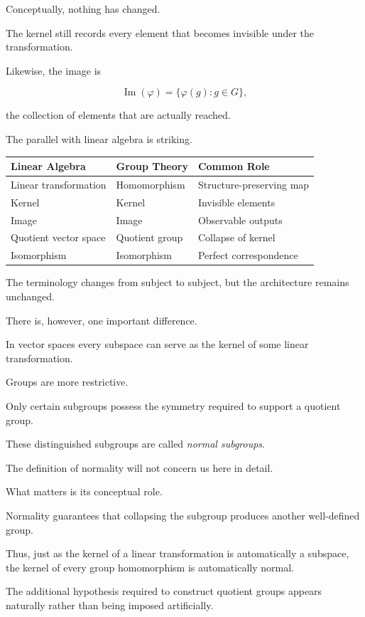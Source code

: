 \documentclass[11pt]{book}
\numberwithin{equation}{chapter}
\theoremstyle{definition}
\theoremstyle{plain}
\theoremstyle{remark}
\DeclareMathOperator{\Image}{Im}
\begin{document}
Conceptually, nothing has changed.

The kernel still records every element that becomes invisible under the transformation.

Likewise, the image is

\[
\Image(\varphi)
=
\{\varphi(g):g\in G\},
\]

the collection of elements that are actually reached.

The parallel with linear algebra is striking.

\begin{center}
\begin{tabular}{lll}
\toprule
Linear Algebra & Group Theory & Common Role\\
\midrule
Linear transformation & Homomorphism & Structure-preserving map\\
Kernel & Kernel & Invisible elements\\
Image & Image & Observable outputs\\
Quotient vector space & Quotient group & Collapse of kernel\\
Isomorphism & Isomorphism & Perfect correspondence\\
\bottomrule
\end{tabular}
\end{center}

The terminology changes from subject to subject, but the architecture remains unchanged.

There is, however, one important difference.

In vector spaces every subspace can serve as the kernel of some linear transformation.

Groups are more restrictive.

Only certain subgroups possess the symmetry required to support a quotient group.

These distinguished subgroups are called \emph{normal subgroups}.

The definition of normality will not concern us here in detail.

What matters is its conceptual role.

Normality guarantees that collapsing the subgroup produces another well-defined group.

Thus, just as the kernel of a linear transformation is automatically a subspace, the kernel of every group homomorphism is automatically normal.

The additional hypothesis required to construct quotient groups appears naturally rather than being imposed artificially.
\end{document}
